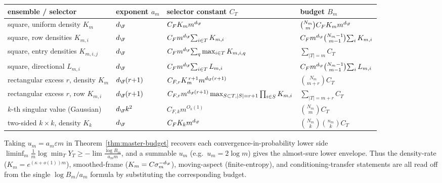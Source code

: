 \begin{center}\small
\begin{tabular}{l l l l}
\hline
ensemble / selector & exponent $a_m$ & selector constant $C_T$ & budget $B_m$\\
\hline
square, uniform density $K_m$ & $d_\F$ & $C_F K_m m^{d_\F}$ & $\binom{N_m}{m}C_F K_m m^{d_\F}$\\
square, row densities $K_{m,i}$ & $d_\F$ & $C_F m^{d_\F}\!\sum_{i\in T}K_{m,i}$ & $C_F m^{d_\F}\binom{N_m-1}{m-1}\!\sum_i K_{m,i}$\\
square, entry densities $K_{m,i,j}$ & $d_\F$ & $C_F m^{d_\F}\!\sum_q \max_{i\in T}K_{m,i,q}$ & $\sum_{|T|=m}C_T$\\
square, directional $L_{m,i}$ & $d_\F$ & $C_F m^{d_\F}\!\sum_{i\in T}L_{m,i}$ & $C_F m^{d_\F}\binom{N_m-1}{m-1}\!\sum_i L_{m,i}$\\
rectangular excess $r$, density $K_m$ & $d_\F(r{+}1)$ & $C_{F,r}K_m^{\,r+1}m^{d_\F(r+1)}$ & $\binom{N_m}{m+r}C_T$\\
rectangular excess $r$, row $K_{m,i}$ & $d_\F(r{+}1)$ & $C_{F,r}m^{d_\F(r+1)}\max_{S\subset T,|S|=r+1}\prod_{i\in S}K_{m,i}$ & $\sum_{|T|=m+r}C_T$\\
$k$-th singular value (Gaussian) & $d_\F k^2$ & $C_{F,k}m^{O_k(1)}$ & $\binom{N_m}{m}C_T$\\
two-sided $k\times k$, density $K_k$ & $d_\F$ & $C_F K_k m^{d_\F}$ & $\binom{N_m}{k}\binom{n_m}{k}C_T$\\
\hline
\end{tabular}
\end{center}

\begin{remark}
Taking $u_m=a_m\varepsilon m$ in Theorem~\ref{thm:master-budget} recovers each
convergence-in-probability lower side $\liminf_m\tfrac1m\log\min_T Y_T\ge-\lim\tfrac{\log B_m}{a_m m}$,
and a summable $u_m$ (e.g.\ $u_m=2\log m$) gives the almost-sure lower envelope.  Thus the
density-rate ($K_m=e^{(\kappa+o(1))m}$), smoothed-frame ($K_m=C\sigma_m^{-d_\F}$),
moving-aspect (finite-entropy), and conditioning-transfer statements are all read off from the
single $\log B_m/a_m$ formula by substituting the corresponding budget.
\end{remark}
